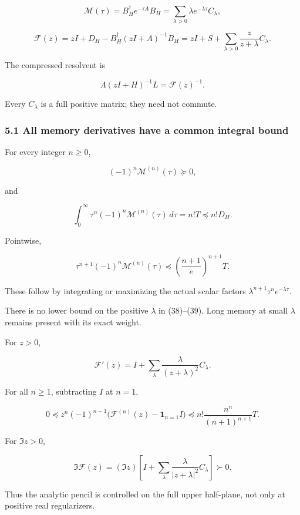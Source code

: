 \documentclass[11pt]{article}
\begin{document}
\[
\boxed{
\mathcal M(\tau)
=
B_H^\dagger e^{-\tau A}B_H
=
\sum_{\lambda>0}\lambda e^{-\lambda\tau}C_\lambda,
}
\tag{35}
\]

\[
\boxed{
\mathcal F(z)
=
zI+D_H-B_H^\dagger(zI+A)^{-1}B_H
=
zI+S+\sum_{\lambda>0}\frac{z}{z+\lambda}C_\lambda.
}
\tag{36}
\]

The compressed resolvent is

\[
\boxed{
\Lambda(zI+H)^{-1}L=\mathcal F(z)^{-1}.
}
\tag{37}
\]

Every \(C_\lambda\) is a full positive matrix; they need not commute.

\subsubsection{5.1 All memory derivatives have a common integral bound}\label{all-memory-derivatives-have-a-common-integral-bound}

For every integer \(n\ge0\),

\[
(-1)^n\mathcal M^{(n)}(\tau)\succeq0,
\]

and

\[
\boxed{
\int_0^\infty
\tau^n(-1)^n\mathcal M^{(n)}(\tau)\,d\tau
=n!T\preceq n!D_H.
}
\tag{38}
\]

Pointwise,

\[
\boxed{
\tau^{n+1}(-1)^n\mathcal M^{(n)}(\tau)
\preceq
\left(\frac{n+1}{e}\right)^{n+1}T.
}
\tag{39}
\]

These follow by integrating or maximizing the actual scalar factors \(\lambda^{n+1}\tau^ne^{-\lambda\tau}\).

There is no lower bound on the positive \(\lambda\) in (38)--(39). Long memory at small \(\lambda\) remains present with its exact weight.

For \(z>0\),

\[
\mathcal F'(z)
=I+\sum_\lambda\frac{\lambda}{(z+\lambda)^2}C_\lambda.
\]

For all \(n\ge1\), subtracting \(I\) at \(n=1\),

\[
\boxed{
0\preceq
z^n(-1)^{n-1}
\bigl(\mathcal F^{(n)}(z)-\mathbf1_{n=1}I\bigr)
\preceq
n!\frac{n^n}{(n+1)^{n+1}}T.
}
\tag{40}
\]

For \(\Im z>0\),

\[
\Im\mathcal F(z)
=
(\Im z)\left[
I+\sum_\lambda
\frac{\lambda}{|z+\lambda|^2}C_\lambda
\right]\succ0.
\tag{41}
\]

Thus the analytic pencil is controlled on the full upper half-plane, not only at positive real regularizers.
\end{document}
